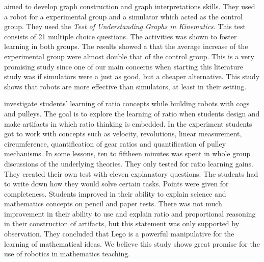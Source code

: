 \bigskip\noindent
{} aimed to develop graph construction and graph interpretations skills. They used a robot for a experimental group and a simulator which acted as the control group. They used the \textit{Test of Understanding Graphs in Kinematics}. This test consists of 21 multiple choice questions. The activities was shown to foster learning in both groups. 
The results showed a that the average increase of the experimental group were almost double that of the control group. 
This is a very promising study since one of our main concerns when starting this literature study was if simulators were a just as good, but a cheaper alternative. This study shows that robots are more effective than simulators, at least in their setting.\cite{mitnik2009collaborative}

\bigskip\noindent
{} investigate students' learning of ratio concepts while building robots with cogs and pulleys. The goal is to explore the learning of ratio when students design and make artifacts in which ratio thinking is embedded. In the experiment students got to work with concepts such as velocity, revolutions, linear measurement, circumference, quantification of gear ratios and quantification of pulley mechanisms. In some lessons, ten to fiftheen minutes was spent in whole group discussions of the underlying theories. They only tested for ratio learning gains. They created their own test with eleven explanatory questions. The students had to write down how they would solve certain tasks. Points were given for completeness. Students improved in their ability to explain science and mathematics concepts on pencil and paper tests. There was not much improvement in their ability to use and explain ratio and proportional reasoning in their construction of artifacts, but this statement was only supported by observation. They concluded that Lego is a powerful manipulative for the learning of mathematical ideas. We believe this study shows great promise for the use of robotics in mathematics teaching.\cite{norton2004using}

